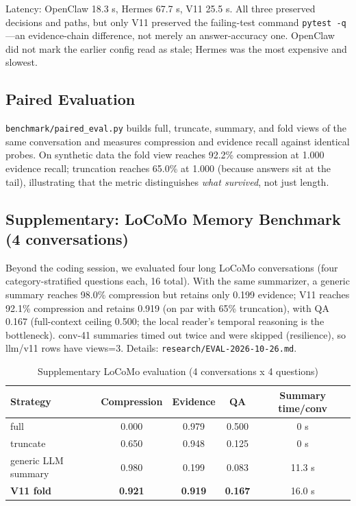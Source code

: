 \documentclass[11pt,a4paper]{article}
\begin{document}
Latency: OpenClaw 18.3 s, Hermes 67.7 s, V11 25.5 s. All three preserved decisions and paths, but only V11 preserved the failing-test command \texttt{pytest -q}---an evidence-chain difference, not merely an answer-accuracy one. OpenClaw did not mark the earlier config read as stale; Hermes was the most expensive and slowest.

\subsection{Paired Evaluation}
\texttt{benchmark/paired\_eval.py} builds full, truncate, summary, and fold views of the same conversation and measures compression and evidence recall against identical probes. On synthetic data the fold view reaches 92.2\% compression at 1.000 evidence recall; truncation reaches 65.0\% at 1.000 (because answers sit at the tail), illustrating that the metric distinguishes \emph{what survived}, not just length.

\subsection{Supplementary: LoCoMo Memory Benchmark (4 conversations)}
Beyond the coding session, we evaluated four long LoCoMo conversations (four category-stratified questions each, 16 total). With the same summarizer, a generic summary reaches 98.0\% compression but retains only 0.199 evidence; V11 reaches 92.1\% compression and retains 0.919 (on par with 65\% truncation), with QA 0.167 (full-context ceiling 0.500; the local reader's temporal reasoning is the bottleneck). conv-41 summaries timed out twice and were skipped (resilience), so llm/v11 rows have views=3. Details: \texttt{research/EVAL-2026-10-26.md}.

\begin{table}[htbp]
\centering
\caption{Supplementary LoCoMo evaluation (4 conversations x 4 questions)}
\begin{tabular}{lcccc}
\toprule
Strategy & Compression & Evidence & QA & Summary time/conv \\
\midrule
full & 0.000 & 0.979 & 0.500 & 0 s \\
truncate & 0.650 & 0.948 & 0.125 & 0 s \\
generic LLM summary & 0.980 & 0.199 & 0.083 & 11.3 s \\
\textbf{V11 fold} & \textbf{0.921} & \textbf{0.919} & \textbf{0.167} & 16.0 s \\
\bottomrule
\end{tabular}
\end{table}
\end{document}
